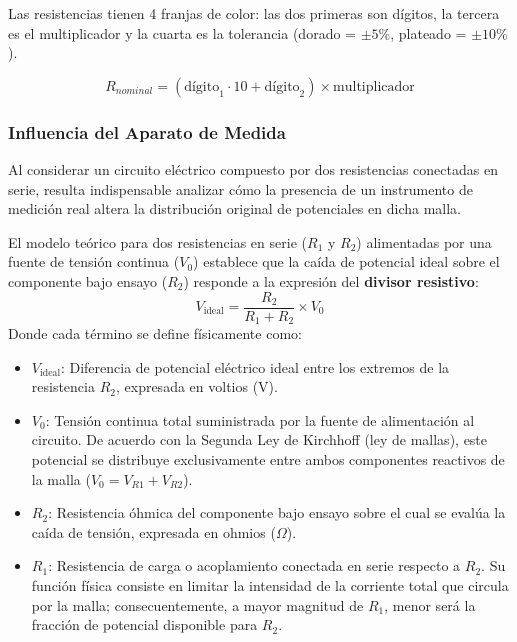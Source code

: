 Las resistencias tienen 4 franjas de color: las dos primeras son dígitos, la tercera es el multiplicador y la cuarta es la tolerancia (dorado = $\pm 5\%$, plateado = $\pm 10\%$).

\begin{equation}
    R_{nominal} = (\text{dígito}_1 \cdot 10 + \text{dígito}_2) \times \text{multiplicador}
    \label{eq:codigo-colores}
\end{equation}


\subsubsection{Influencia del Aparato de Medida}

Al considerar un circuito eléctrico compuesto por dos resistencias conectadas en serie, resulta indispensable analizar cómo la presencia de un instrumento de medición real altera la distribución original de potenciales en dicha malla. 

El modelo teórico para dos resistencias en serie ($R_1$ y $R_2$) alimentadas por una fuente de tensión continua ($V_0$) establece que la caída de potencial ideal sobre el componente bajo ensayo ($R_2$) responde a la expresión del \textbf{divisor resistivo}:
\begin{equation}
    V_{\text{ideal}} = \frac{R_2}{R_1 + R_2} \times V_0
\label{eq:divisor-ideal}
\end{equation}
Donde cada término se define físicamente como:
\begin{itemize}
    \item $V_{\text{ideal}}$: Diferencia de potencial eléctrico ideal entre los extremos de la resistencia $R_2$, expresada en voltios ($\text{V}$).
    \item $V_0$: Tensión continua total suministrada por la fuente de alimentación al circuito. De acuerdo con la Segunda Ley de Kirchhoff (ley de mallas), este potencial se distribuye exclusivamente entre ambos componentes reactivos de la malla ($V_0 = V_{R1} + V_{R2}$).
    \item $R_2$: Resistencia óhmica del componente bajo ensayo sobre el cual se evalúa la caída de tensión, expresada en ohmios ($\Omega$).
    \item $R_1$: Resistencia de carga o acoplamiento conectada en serie respecto a $R_2$. Su función física consiste en limitar la intensidad de la corriente total que circula por la malla; consecuentemente, a mayor magnitud de $R_1$, menor será la fracción de potencial disponible para $R_2$.
\end{itemize}

